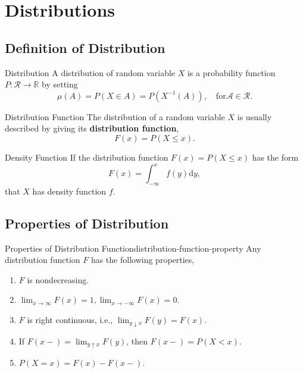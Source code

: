 \section{Distributions}

\subsection{Definition of Distribution}

\begin{definition}{Distribution}{}
    A distribution of random variable $X$ is a probability function $P:\mathcal{R}\rightarrow\mathbb{R}$ by setting
    \begin{equation}
        \mu(A)=P(X\in A)=P\left(X^{-1}(A)\right),\quad\text{for}\mathcal{A}\in\mathcal{R}.
    \end{equation}
\end{definition}

\begin{definition}{Distribution Function}{}
    The distribution of a random variable $X$ is usually described by giving its \textbf{distribution function},
    \begin{equation}
        F(x)=P(X\leq x).
    \end{equation}
\end{definition}

\begin{definition}{Density Function}{}
    If the distribution function $F(x)=P(X\leq x)$ has the form
    \begin{equation*}
        F(x)=\int_{-\infty}^{x}f(y)\mathrm{d}y,
    \end{equation*}
   that $X$ has density function $f$.
\end{definition}

\subsection{Properties of Distribution}

\begin{theorem}{Properties of Distribution Function}{distribution-function-property}
    Any distribution function $F$ has the following properties,
    \begin{enumerate}
        \item $F$ is nondecreasing.
        \item $\lim_{x\rightarrow\infty}F(x)=1,\lim_{x \rightarrow-\infty}F(x)=0$.
        \item $F$ is right continuous, i.e., $\lim_{y \downarrow x} F(y)=F(x)$.
        \item If $F(x-)=\lim_{y\uparrow x}F(y)$, then $F(x-)=P(X<x)$.
        \item $P(X=x)=F(x)-F(x-)$.
    \end{enumerate}
\end{theorem}

